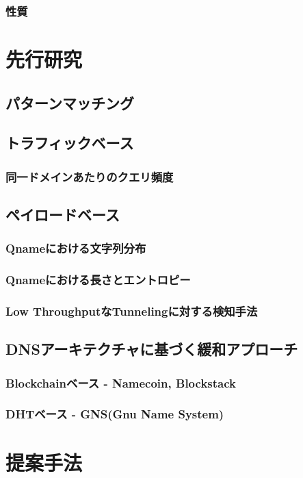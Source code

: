 \documentclass[12pt]{jarticle} %
\begin{document}
\subsubsection{性質}


\newpage
\section{先行研究}
\subsection{パターンマッチング}
\subsection{トラフィックベース}
\subsubsection{同一ドメインあたりのクエリ頻度}
\subsection{ペイロードベース}
\subsubsection{Qnameにおける文字列分布}
\subsubsection{Qnameにおける長さとエントロピー}
\subsubsection{Low ThroughputなTunnelingに対する検知手法}
\subsection{DNSアーキテクチャに基づく緩和アプローチ}
\subsubsection{Blockchainベース - Namecoin, Blockstack}
\subsubsection{DHTベース - GNS(Gnu Name System)}



\newpage
\section{提案手法}
\end{document}
